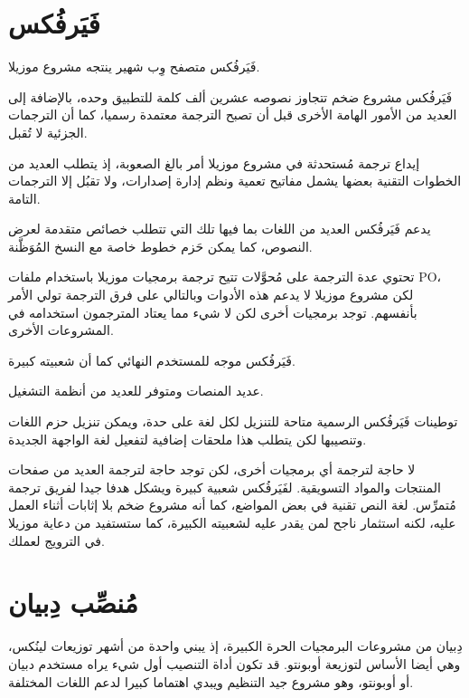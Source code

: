\section{فَيَرفُكس}
فَيَرفُكس متصفح وِب شهير ينتجه مشروع موزيلا.

\startitemize[1]
\item فَيَرفُكس مشروع ضخم تتجاوز نصوصه عشرين ألف كلمة للتطبيق وحده،
بالإضافة إلى العديد من الأمور الهامة الأخرى قبل أن تصبح الترجمة معتمدة
رسميا، كما أن الترجمات الجزئية لا تُقبل.
\item إيداع ترجمة مُستحدثة في مشروع موزيلا أمر بالغ الصعوبة، إذ يتطلب
العديد من الخطوات التقنية بعضها يشمل مفاتيح تعمية ونظم إدارة إصدارات،
ولا تقبُل إلا الترجمات التامة.
\item يدعم فَيَرفُكس العديد من اللغات بما فيها تلك التي تتطلب خصائص
متقدمة لعرض النصوص، كما يمكن حَزم خطوط خاصة مع النسخ المُوَظَّنة.
\item تحتوي عدة الترجمة على مُحوَّلات تتيح ترجمة برمجيات موزيلا باستخدام
ملفات PO، لكن مشروع موزيلا لا يدعم هذه الأدوات وبالتالي على فرق الترجمة
تولي الأمر بأنفسهم. توجد برمجيات أخرى لكن لا شيء مما يعتاد المترجمون
استخدامه في المشروعات الأخرى.
\item فَيَرفُكس موجه للمستخدم النهائي كما أن شعبيته كبيرة.
\stopitemize
\startitemize[1]
\item عديد المنصات ومتوفر للعديد من أنظمة التشغيل.
\item توطينات فَيَرفُكس الرسمية متاحة للتنزيل لكل لغة على حدة، ويمكن
تنزيل حزم اللغات وتنصيبها لكن يتطلب هذا ملحقات إضافية لتفعيل لغة
الواجهة الجديدة.
\item لا حاجة لترجمة أي برمجيات أخرى، لكن توجد حاجة لترجمة العديد من
صفحات المنتجات والمواد التسويقية.
\stopitemize
لفَيَرفُكس شعبية كبيرة ويشكل هدفا جيدا لفريق ترجمة مُتمرِّس. لغة النص
تقنية في بعض المواضع، كما أنه مشروع ضخم بلا إثابات أثناء العمل عليه،
لكنه استثمار ناجح لمن يقدر عليه لشعبيته الكبيرة، كما ستستفيد من دعاية
موزيلا في الترويج لعملك.

\section{مُنصِّب دِبيان}
دِبيان من مشروعات البرمجيات الحرة الكبيرة، إذ يبني واحدة من أشهر توزيعات
لينُكس، وهي أيضا الأساس لتوزيعة أوبونتو. قد تكون أداة التنصيب أول شيء
يراه مستخدم دبيان أو أوبونتو، وهو مشروع جيد التنظيم ويبدي اهتماما كبيرا
لدعم اللغات المختلفة.

